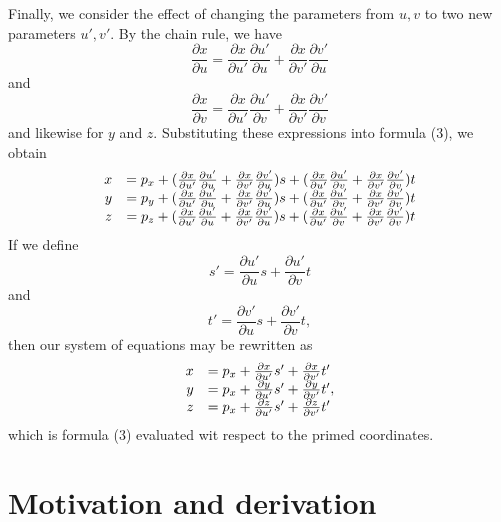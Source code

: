 \documentclass[12pt]{article}
\begin{document}
Finally, we consider the effect of changing the parameters from $u,v$ to two new parameters $u',v'$.  By the chain rule, we have
  $$\frac{\partial x}{\partial u} = \frac{\partial x}{\partial u'} \frac{\partial u'}{\partial u} + \frac{\partial x}{\partial v'} \frac{\partial v'}{\partial u}$$
and
 $$\frac{\partial x}{\partial v} = \frac{\partial x}{\partial u'} \frac{\partial u'}{\partial v} + \frac{\partial x}{\partial v'} \frac{\partial v'}{\partial v}$$
and likewise for $y$ and $z$.  Substituting these expressions into formula (3), we obtain
 $$\begin{matrix}
\hfill x &= p_x + (\frac{\partial x}{\partial u'} \frac{\partial u'}{\partial u} + \frac{\partial x}{\partial v'} \frac{\partial v'}{\partial u}) s + (\frac{\partial x}{\partial u'} \frac{\partial u'}{\partial v} + \frac{\partial x}{\partial v'} \frac{\partial v'}{\partial v})t \\
\hfill y &= p_y + (\frac{\partial x}{\partial u'} \frac{\partial u'}{\partial u} + \frac{\partial x}{\partial v'} \frac{\partial v'}{\partial u}) s + (\frac{\partial x}{\partial u'} \frac{\partial u'}{\partial v} + \frac{\partial x}{\partial v'} \frac{\partial v'}{\partial v})t \\
\hfill z &= p_z + (\frac{\partial x}{\partial u'} \frac{\partial u'}{\partial u} + \frac{\partial x}{\partial v'} \frac{\partial v'}{\partial u}) s + (\frac{\partial x}{\partial u'} \frac{\partial u'}{\partial v} + \frac{\partial x}{\partial v'} \frac{\partial v'}{\partial v})t
\end{matrix}$$
If we define
 $$s' = \frac{\partial u'}{\partial u} s + \frac{\partial u'}{\partial v} t$$
and
 $$t' = \frac{\partial v'}{\partial u} s + \frac{\partial v'}{\partial v} t,$$
then our system of equations may be rewritten as
 $$\begin{matrix} \hfill x &= p_x + \frac{\partial x}{\partial u'} s' +  \frac{\partial x}{\partial v'} t' \\
 \hfill y &= p_x + \frac{\partial y}{\partial u'} s' +  \frac{\partial y}{\partial v'} t' \\
 \hfill z &= p_x + \frac{\partial z}{\partial u'} s' + \frac{\partial z}{\partial v'} t' \end{matrix},$$
which is formula (3) evaluated wit respect to the primed coordinates.

\section{Motivation and derivation}
\end{document}
